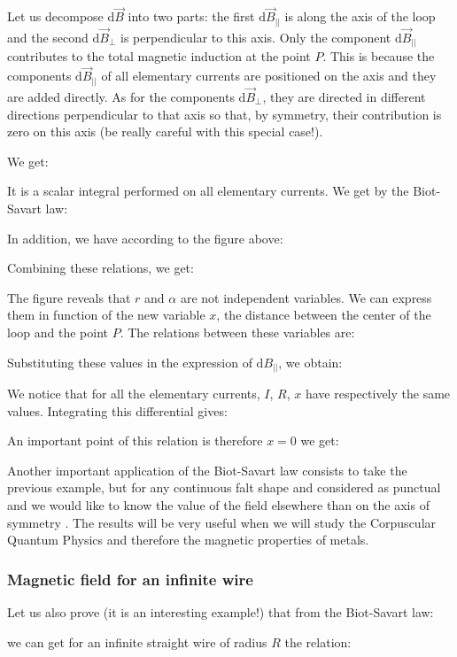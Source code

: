 	Let us decompose $\mathrm{d}\vec{B}$ into two parts: the first $\mathrm{d}\vec{B}_{||}$ is along the axis of the loop and the second $\mathrm{d}\vec{B}_{\perp}$ is perpendicular to this axis. Only the component $\mathrm{d}\vec{B}_{||}$ contributes to the total magnetic induction at the point $P$. This is because the components $\mathrm{d}\vec{B}_{||}$ of all elementary currents are positioned on the axis and they are added directly. As for the components $\mathrm{d}\vec{B}_{\perp}$, they are directed in different directions perpendicular to that axis so that, by symmetry, their contribution is zero on this axis (be really careful with this special case!).
	
	 We get:
	
	It is a scalar integral performed on all elementary currents. We get by the Biot-Savart law:
	
	In addition, we have according to the figure above:
	
	Combining these relations, we get:
	
	The figure reveals that $r$ and $\alpha$ are not independent variables. We can express them in function of the new variable $x$, the distance between the center of the loop and the point $P$. The relations between these variables are:
	
	Substituting these values in the expression of $\mathrm{d}B_{||}$, we obtain:
	
	We notice that for all the elementary currents, $I$, $R$, $x$ have respectively the same values. Integrating this differential gives:
	
	An important point of this relation is therefore $x=0$ we get:
	
	Another important application of the Biot-Savart law consists to take the previous example, but for any continuous falt shape and considered as punctual and we would like to know the value of the field elsewhere than on the axis of symmetry . The results will be very useful when we will study the Corpuscular Quantum Physics and therefore the magnetic properties of metals.
	
	\subsubsection{Magnetic field for an infinite wire}\label{magnetic field for an infinite wire}
	Let us also prove (it is an interesting example!) that from the Biot-Savart law:
	
	we can get for an infinite straight wire of radius $R$ the relation:
	
